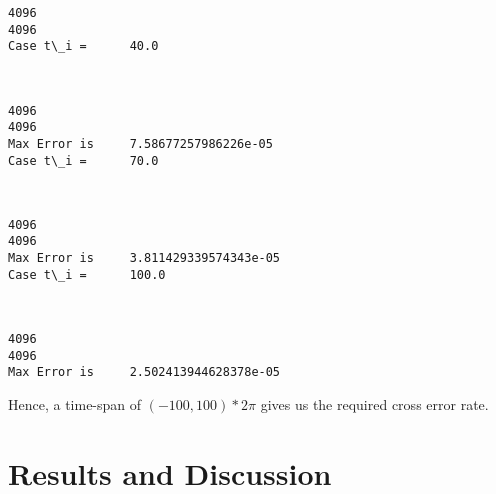 \documentclass[11pt]{article}
\begin{document}
    \begin{Verbatim}[commandchars=\\\{\}]
4096
4096
Case t\_i = 	 40.0

    \end{Verbatim}

    \begin{center}
    \end{center}
    { \hspace*{\fill} \\}
    
    \begin{Verbatim}[commandchars=\\\{\}]
4096
4096
Max Error is 	 7.58677257986226e-05
Case t\_i = 	 70.0

    \end{Verbatim}

    \begin{center}
    \end{center}
    { \hspace*{\fill} \\}
    
    \begin{Verbatim}[commandchars=\\\{\}]
4096
4096
Max Error is 	 3.811429339574343e-05
Case t\_i = 	 100.0

    \end{Verbatim}

    \begin{center}
    \end{center}
    { \hspace*{\fill} \\}
    
    \begin{Verbatim}[commandchars=\\\{\}]
4096
4096
Max Error is 	 2.502413944628378e-05

    \end{Verbatim}

    Hence, a time-span of \((-100,100)*2\pi\) gives us the required cross
error rate.

    \section{Results and Discussion}\label{results-and-discussion}
\end{document}
